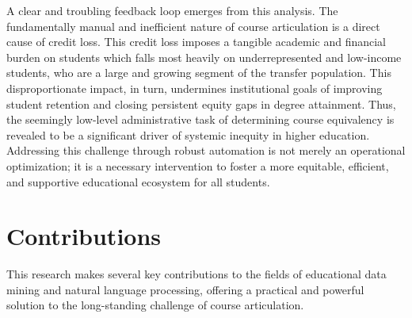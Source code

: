 A clear and troubling feedback loop emerges from this analysis. The fundamentally manual and inefficient nature of course articulation is a direct cause of credit loss. This credit loss imposes a tangible academic and financial burden on students which falls most heavily on underrepresented and low-income students, who are a large and growing segment of the transfer population. This disproportionate impact, in turn, undermines institutional goals of improving student retention and closing persistent equity gaps in degree attainment. Thus, the seemingly low-level administrative task of determining course equivalency is revealed to be a significant driver of systemic inequity in higher education. Addressing this challenge through robust automation is not merely an operational optimization; it is a necessary intervention to foster a more equitable, efficient, and supportive educational ecosystem for all students.

\section{Contributions}
This research makes several key contributions to the fields of educational data mining and natural language processing, offering a practical and powerful solution to the long-standing challenge of course articulation.

